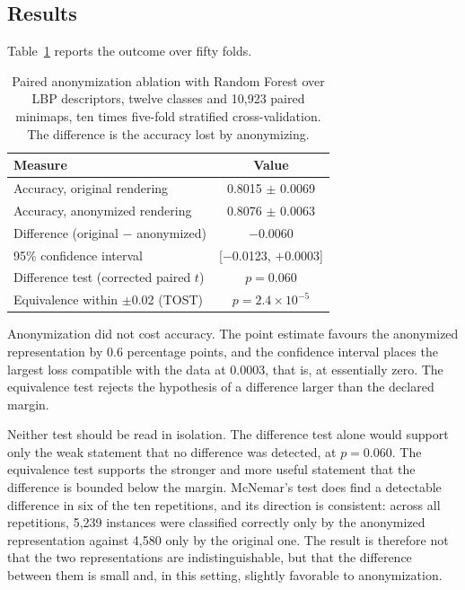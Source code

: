 \subsection{Results}

Table~\ref{tab:a2-anonymization} reports the outcome over fifty folds.

\begin{table}[ht]
\centering
\caption{Paired anonymization ablation with Random Forest over LBP descriptors,
twelve classes and 10,923 paired minimaps, ten times five-fold stratified
cross-validation. The difference is the accuracy lost by anonymizing.}
\label{tab:a2-anonymization}
\begin{tabular}{lc}
\toprule
\textbf{Measure} & \textbf{Value} \\
\midrule
Accuracy, original rendering & 0.8015 $\pm$ 0.0069 \\
Accuracy, anonymized rendering & 0.8076 $\pm$ 0.0063 \\
Difference (original $-$ anonymized) & $-$0.0060 \\
95\% confidence interval & [$-$0.0123, $+$0.0003] \\
Difference test (corrected paired $t$) & $p = 0.060$ \\
Equivalence within $\pm$0.02 (TOST) & $p = 2.4 \times 10^{-5}$ \\
\bottomrule
\end{tabular}
\fautor
\end{table}

Anonymization did not cost accuracy. The point estimate favours the anonymized
representation by 0.6 percentage points, and the confidence interval places the
largest loss compatible with the data at 0.0003, that is, at essentially zero.
The equivalence test rejects the hypothesis of a difference larger than the
declared margin.

Neither test should be read in isolation. The difference
test alone would support only the weak statement that no difference was
detected, at $p = 0.060$. The equivalence test supports the stronger and more
useful statement that the difference is bounded below the margin. McNemar's test
does find a detectable difference in six of the ten repetitions, and its
direction is consistent: across all repetitions, 5,239 instances were classified
correctly only by the anonymized representation against 4,580 only by the
original one. The result is therefore not that the two representations are
indistinguishable, but that the difference between them is small and, in this
setting, slightly favorable to anonymization.

